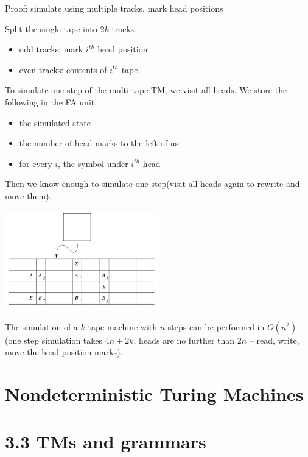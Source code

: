 \documentclass[handout]{beamer}
\begin{document}
\begin{frame}{Proof: simulate using multiple tracks, mark head positions}

    Split the single tape into $2k$ tracks.
    \begin{itemize}
        \item odd tracks: mark $i^{th}$ head position
        \item even tracks: contents of $i^{th}$ tape
    \end{itemize}

    To simulate one step of the multi-tape TM, we visit all heads. We store the following in the FA unit:
           
    \begin{itemize}
        \item the simulated state
        \item the number of head marks to the left of us
        \item for every $i$, the symbol under $i^{th}$ head
    \end{itemize}
    Then we know enough to simulate one step(visit all heads again to rewrite and move them).
        
        {\center \includegraphics[width=0.5\textwidth]{files/tmmultitrack.PNG}}

        \hfill\qedsymbol

        
    The simulation of a $k$-tape machine with $n$ steps can be performed in $O(n^2)$ (one step simulation takes $4n+2k$, heads are no further than $2n$ -- read, write, move the head position marks).

    

\end{frame}


\section*{Nondeterministic Turing Machines}






\section{3.3 TMs and grammars}
\end{document}
